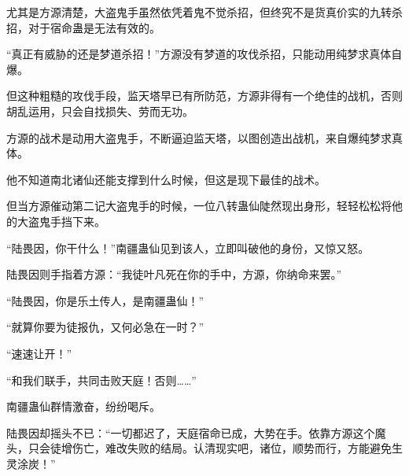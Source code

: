 \begin{this_body}
尤其是方源清楚，大盗鬼手虽然依凭着鬼不觉杀招，但终究不是货真价实的九转杀招，对于宿命蛊是无法有效的。

“真正有威胁的还是梦道杀招！”方源没有梦道的攻伐杀招，只能动用纯梦求真体自爆。

但这种粗糙的攻伐手段，监天塔早已有所防范，方源非得有一个绝佳的战机，否则胡乱运用，只会自找损失、劳而无功。

方源的战术是动用大盗鬼手，不断逼迫监天塔，以图创造出战机，来自爆纯梦求真体。

他不知道南北诸仙还能支撑到什么时候，但这是现下最佳的战术。

但当方源催动第二记大盗鬼手的时候，一位八转蛊仙陡然现出身形，轻轻松松将他的大盗鬼手挡下来。

“陆畏因，你干什么！”南疆蛊仙见到该人，立即叫破他的身份，又惊又怒。

陆畏因则手指着方源：“我徒叶凡死在你的手中，方源，你纳命来罢。”

“陆畏因，你是乐土传人，是南疆蛊仙！”

“就算你要为徒报仇，又何必急在一时？”

“速速让开！”

“和我们联手，共同击败天庭！否则……”

南疆蛊仙群情激奋，纷纷喝斥。

陆畏因却摇头不已：“一切都迟了，天庭宿命已成，大势在手。依靠方源这个魔头，只会徒增伤亡，难改失败的结局。认清现实吧，诸位，顺势而行，方能避免生灵涂炭！”

\end{this_body}

